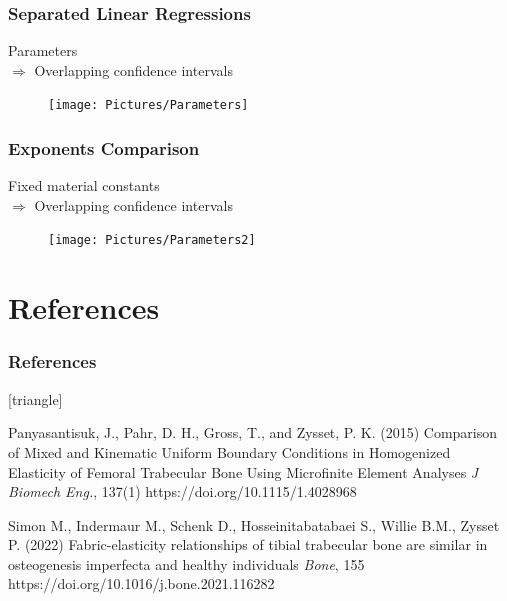 \documentclass[xcolor=table,11pt]{beamer}
\begin{document}
	\begin{frame}
		\frametitle{Separated Linear Regressions}
		Parameters\\
		$\Rightarrow$ Overlapping confidence intervals\\\vfill
		\begin{figure}
			\centering
			\texttt{[image: Pictures/Parameters]}
		\end{figure}
	\end{frame}

	\begin{frame}
		\frametitle{Exponents Comparison}
		Fixed material constants\\
		$\Rightarrow$ Overlapping confidence intervals\\\vfill
		\begin{figure}
			\centering
			\texttt{[image: Pictures/Parameters2]}
		\end{figure}
	\end{frame}
		

	\section{References}

	\begin{frame}
		\frametitle{References}
		\footnotesize{
				\begin{thebibliography}{99}
						\setbeamertemplate{bibliography item}[triangle]
						
						 Panyasantisuk, J., Pahr, D. H., Gross, T., and Zysset, P. K. (2015)
						\newblock Comparison of Mixed and Kinematic Uniform Boundary Conditions in Homogenized Elasticity of Femoral Trabecular Bone Using Microfinite Element Analyses
						\newblock \textit{J Biomech Eng.}, 137(1)
						\newblock https://doi.org/10.1115/1.4028968

						Simon M., Indermaur M., Schenk D., Hosseinitabatabaei S., Willie B.M., Zysset P. (2022)
						\newblock Fabric-elasticity relationships of tibial trabecular bone are similar in osteogenesis imperfecta and healthy individuals
						\newblock \textit{Bone}, 155
						\newblock https://doi.org/10.1016/j.bone.2021.116282
						
					\end{thebibliography}
			}
	\end{frame}
	
\end{document}
